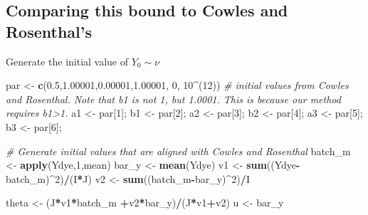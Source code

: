 \documentclass[
]{article}
\newenvironment{Shaded}{\begin{snugshade}}{\end{snugshade}}
\newcommand{\CommentTok}[1]{\textcolor[rgb]{0.56,0.35,0.01}{\textit{#1}}}
\newcommand{\DecValTok}[1]{\textcolor[rgb]{0.00,0.00,0.81}{#1}}
\newcommand{\FloatTok}[1]{\textcolor[rgb]{0.00,0.00,0.81}{#1}}
\newcommand{\FunctionTok}[1]{\textcolor[rgb]{0.13,0.29,0.53}{\textbf{#1}}}
\newcommand{\NormalTok}[1]{#1}
\newcommand{\OtherTok}[1]{\textcolor[rgb]{0.56,0.35,0.01}{#1}}
\newcommand{\SpecialCharTok}[1]{\textcolor[rgb]{0.81,0.36,0.00}{\textbf{#1}}}
\begin{document}
\subsection{Comparing this bound to Cowles and
Rosenthal's}\label{comparing-this-bound-to-cowles-and-rosenthals}

Generate the initial value of \(Y_0\sim \nu\)

\begin{Shaded}
\begin{Highlighting}[]
\NormalTok{par }\OtherTok{\textless{}{-}} \FunctionTok{c}\NormalTok{(}\FloatTok{0.5}\NormalTok{,}\FloatTok{1.00001}\NormalTok{,}\FloatTok{0.00001}\NormalTok{,}\FloatTok{1.00001}\NormalTok{, }\DecValTok{0}\NormalTok{, }\DecValTok{10}\SpecialCharTok{\^{}}\NormalTok{(}\DecValTok{12}\NormalTok{))   }\CommentTok{\# initial values from Cowles and Rosenthal. Note that b1 is not 1, but 1.0001. This is because our method requires b1\textgreater{}1.}
\NormalTok{a1 }\OtherTok{\textless{}{-}}\NormalTok{ par[}\DecValTok{1}\NormalTok{]; b1 }\OtherTok{\textless{}{-}}\NormalTok{ par[}\DecValTok{2}\NormalTok{]; a2 }\OtherTok{\textless{}{-}}\NormalTok{ par[}\DecValTok{3}\NormalTok{]; b2 }\OtherTok{\textless{}{-}}\NormalTok{ par[}\DecValTok{4}\NormalTok{]; a3 }\OtherTok{\textless{}{-}}\NormalTok{ par[}\DecValTok{5}\NormalTok{]; b3 }\OtherTok{\textless{}{-}}\NormalTok{ par[}\DecValTok{6}\NormalTok{];}
\end{Highlighting}
\end{Shaded}

\begin{Shaded}
\begin{Highlighting}[]
\CommentTok{\# Generate initial values that are aligned with Cowles and Rosenthal}
\NormalTok{batch\_m }\OtherTok{\textless{}{-}} \FunctionTok{apply}\NormalTok{(Ydye,}\DecValTok{1}\NormalTok{,mean)}
\NormalTok{bar\_y }\OtherTok{\textless{}{-}} \FunctionTok{mean}\NormalTok{(Ydye)}
\NormalTok{v1 }\OtherTok{\textless{}{-}} \FunctionTok{sum}\NormalTok{((Ydye}\SpecialCharTok{{-}}\NormalTok{batch\_m)}\SpecialCharTok{\^{}}\DecValTok{2}\NormalTok{)}\SpecialCharTok{/}\NormalTok{(I}\SpecialCharTok{*}\NormalTok{J)}
\NormalTok{v2 }\OtherTok{\textless{}{-}} \FunctionTok{sum}\NormalTok{((batch\_m}\SpecialCharTok{{-}}\NormalTok{bar\_y)}\SpecialCharTok{\^{}}\DecValTok{2}\NormalTok{)}\SpecialCharTok{/}\NormalTok{I}

\NormalTok{theta }\OtherTok{\textless{}{-}}\NormalTok{ (J}\SpecialCharTok{*}\NormalTok{v1}\SpecialCharTok{*}\NormalTok{batch\_m }\SpecialCharTok{+}\NormalTok{v2}\SpecialCharTok{*}\NormalTok{bar\_y)}\SpecialCharTok{/}\NormalTok{(J}\SpecialCharTok{*}\NormalTok{v1}\SpecialCharTok{+}\NormalTok{v2)}
\NormalTok{u }\OtherTok{\textless{}{-}}\NormalTok{ bar\_y}
\end{Highlighting}
\end{Shaded}
\end{document}
